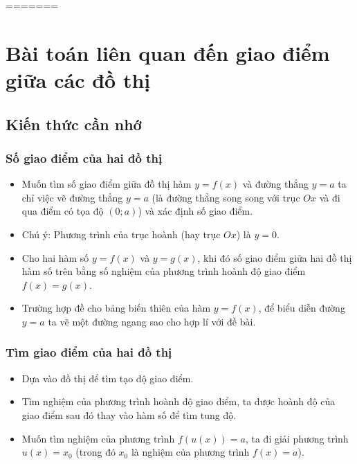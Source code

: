 =======
\setcounter{ex}{0}
\section{Bài toán liên quan đến giao điểm giữa các đồ thị}
\subsection{Kiến thức cần nhớ}
\begin{khung}
	\subsubsection{Số giao điểm của hai đồ thị}
	\begin{itemize}
		\item Muốn tìm số giao điểm giữa đồ thị hàm $y=f(x)$ và đường thẳng $y=a$ ta chỉ việc vẽ đường thẳng $y=a$ (là đường thẳng song song với trục $Ox$ và đi qua điểm có tọa độ $(0;a)$) và xác định số giao điểm.
		\item  Chú ý: Phương trình của trục hoành (hay trục $Ox$) là $y=0$.
		\item Cho hai hàm số $y=f(x)$ và $y=g(x)$, khi đó số giao điểm giữa hai đồ thị hàm số trên bằng số nghiệm của phương trình hoành độ giao điểm $f(x)=g(x)$.
		\item Trường hợp đề cho bảng biến thiên của hàm $y=f(x)$, để biểu diễn đường $y=a$ ta vẽ một đường ngang sao cho hợp lí với đề bài.
			\end{itemize}
			\subsubsection{Tìm giao điểm của hai đồ thị}
			\begin{itemize}
				\item Dựa vào đồ thị để tìm tạo độ giao điểm.\item Tìm nghiệm của phương trình hoành độ giao điểm, ta được hoành độ của giao điểm sau đó thay vào hàm số để tìm tung độ. \item Muốn tìm nghiệm của phương trình $f(u(x))=a$, ta đi giải phương trình $u(x)=x_0$ (trong đó $x_0$ là nghiệm của phương trình $f(x)=a$).
			\end{itemize}
\end{khung}
